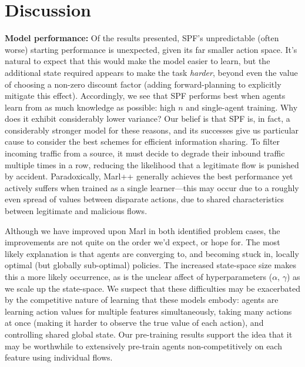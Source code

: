 \documentclass[conference, a4paper, 10pt, times]{IEEEtran}
\newcommand{\fakepara}[1]{\noindent\textbf{#1:}}
\begin{document}
\section{Discussion}\label{sec:discussion}


\fakepara{Model performance}
Of the results presented, SPF's unpredictable (often worse) starting performance is unexpected, given its far smaller action space.
It's natural to expect that this would make the model easier to learn, but the additional state required appears to make the task \emph{harder}, beyond even the value of choosing a non-zero discount factor (adding forward-planning to explicitly mitigate this effect).
Accordingly, we see that SPF performs best when agents learn from as much knowledge as possible: high $n$ and single-agent training.
Why does it exhibit considerably lower variance?
Our belief is that SPF is, in fact, a considerably stronger model for these reasons, and its successes give us particular cause to consider the best schemes for efficient information sharing.
To filter incoming traffic from a source, it must decide to degrade their inbound traffic multiple times in a row, reducing the likelihood that a legitimate flow is punished by accident.
Paradoxically, Marl++ generally achieves the best performance yet actively suffers when trained as a single learner---this may occur due to a roughly even spread of values between disparate actions, due to shared characteristics between legitimate and malicious flows.

Although we have improved upon Marl in both identified problem cases, the improvements are not quite on the order we'd expect, or hope for.
The most likely explanation is that agents are converging to, and becoming stuck in, locally optimal (but globally sub-optimal) policies.
The increased state-space size makes this a more likely occurrence, as is the unclear affect of hyperparameters ($\alpha$, $\gamma$) as we scale up the state-space.
We suspect that these difficulties may be exacerbated by the competitive nature of learning that these models embody: agents are learning action values for multiple features simultaneously, taking many actions at once (making it harder to observe the true value of each action), and controlling shared global state.
Our pre-training results support the idea that it may be worthwhile to extensively pre-train agents non-competitively on each feature using individual flows.
\end{document}
